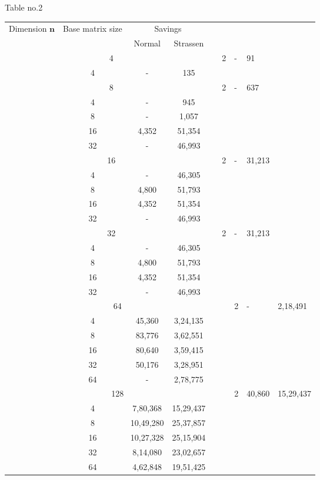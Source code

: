 \documentclass[a4paper,11pt]{article}
\begin{document}
\begin{enumerate}
\begin{center}
Table no.2
\begin{tabular}[pos]{|c|c|c|c|}
\hline
\multirow{2}{*}{Dimension $\mathbf{n}$} & \multirow{2}{*}{Base matrix size} & \multicolumn{2}{|c|}{Savings} \\ \cline{3-4}
& & Normal & Strassen \\ \hline
\multicolumn{5}{|c|}{4} & 2 & - & 91 \\ \cline{2-4}
& 4 & - & 135 \\ \hline
\multicolumn{5}{|c|}{8} & 2 & - & 637 \\ \cline{2-4}
& 4 & - & 945 \\ \cline{2-4}
& 8 & - & 1,057 \\ \cline{2-4}
& 16 & 4,352 & 51,354 \\ \cline{2-4}
& 32 & - & 46,993 \\ \hline
\multicolumn{5}{|c|}{16} & 2 & - & 31,213 \\ \cline{2-4}
& 4 & - & 46,305 \\ \cline{2-4}
& 8 & 4,800 & 51,793 \\ \cline{2-4}
& 16 & 4,352 & 51,354 \\ \cline{2-4}
& 32 & - & 46,993 \\ \hline
\multicolumn{5}{|c|}{32} & 2 & - & 31,213 \\ \cline{2-4}
& 4 & - & 46,305 \\ \cline{2-4}
& 8 & 4,800 & 51,793 \\ \cline{2-4}
& 16 & 4,352 & 51,354 \\ \cline{2-4}
& 32 & - & 46,993 \\ \hline
\multicolumn{6}{|c|}{64} & 2 & - & 2,18,491 \\ \cline{2-4}
& 4 & 45,360 & 3,24,135 \\ \cline{2-4}
& 8 & 83,776 & 3,62,551 \\ \cline{2-4}
& 16 & 80,640 & 3,59,415 \\ \cline{2-4}
& 32 & 50,176 & 3,28,951 \\ \cline{2-4}
& 64 & - & 2,78,775 \\ \hline
\multicolumn{6}{|c|}{128} & 2 & 40,860 & 15,29,437 \\ \cline{2-4}
& 4 & 7,80,368 & 15,29,437 \\ \cline{2-4}
& 8 & 10,49,280 & 25,37,857 \\ \cline{2-4}
& 16 & 10,27,328 & 25,15,904 \\ \cline{2-4}
& 32 & 8,14,080 & 23,02,657 \\ \cline{2-4}
& 64 & 4,62,848 & 19,51,425 \\ \cline{2-4}
\hline
\end{tabular}
\end{center}

\end{enumerate}
\end{document}
